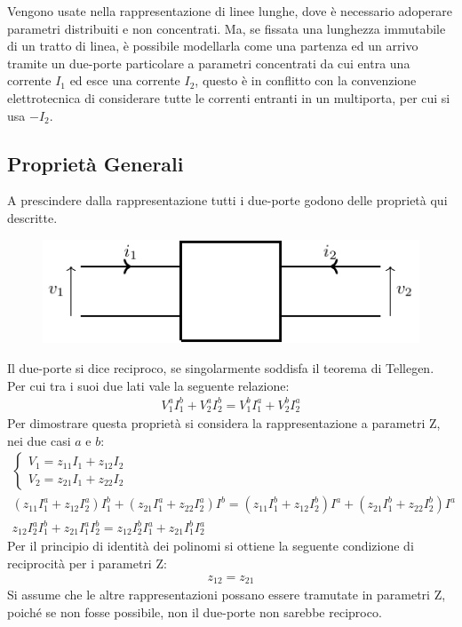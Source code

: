 \documentclass{article}
\numberwithin{equation}{subsection}
\begin{document}
Vengono usate nella rappresentazione di linee lunghe, dove è necessario adoperare parametri distribuiti e non concentrati. Ma, se fissata una lunghezza immutabile 
di un tratto di linea, è possibile modellarla come una partenza ed un arrivo tramite un 
due-porte particolare a parametri concentrati da cui entra una corrente $I_1$ ed esce una corrente $I_2$, questo è in conflitto con la convenzione elettrotecnica di considerare 
tutte le correnti entranti in un multiporta, per cui si usa $-I_2$. 

\subsection{Proprietà Generali}

A prescindere dalla rappresentazione tutti i due-porte godono delle proprietà qui descritte. 

\begin{figure}[H]%
    \centering
    \includegraphics{due-porte-generico.pdf}%
    \label{fig:due-porte-generico}
\end{figure}

Il due-porte si dice reciproco, se singolarmente soddisfa il teorema di Tellegen. Per cui tra i suoi due lati vale la seguente relazione: 
\begin{gather*}
    V_1^aI_1^b+V_2^aI_2^b=V_1^bI_1^a+V_2^bI_2^a
\end{gather*}
Per dimostrare questa proprietà si considera la rappresentazione a parametri Z, nei due casi $a$ e $b$:
\begin{gather*}
    \begin{cases}
        V_1=z_{11}I_1+z_{12}I_2\\
        V_2=z_{21}I_1+z_{22}I_2
    \end{cases}\\
    (z_{11}I_1^a+z_{12}I_2^a)I_1^b+(z_{21}I_1^a+z_{22}I_2^a)I^b=(z_{11}I_1^b+z_{12}I_2^b)I^a+(z_{21}I_1^b+z_{22}I_2^b)I^a\\
    z_{12}I_2^aI_1^b+z_{21}I_1^aI_2^b=z_{12}I_2^bI_1^a+z_{21}I_1^bI_2^a
\end{gather*}
Per il principio di identità dei polinomi si ottiene la seguente condizione di reciprocità per i parametri Z:
\begin{gather*}
    z_{12}=z_{21}
\end{gather*}
Si assume che le altre rappresentazioni possano essere tramutate in parametri Z, poiché se non fosse possibile, non il due-porte non sarebbe reciproco. 
\end{document}
